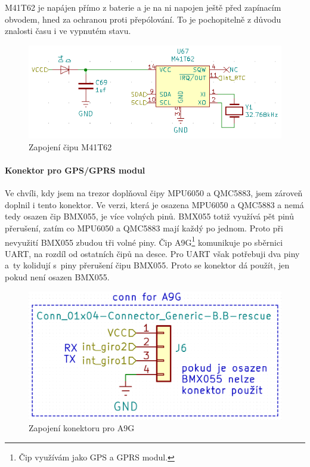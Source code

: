 M41T62 je napájen přímo z baterie a je na ni napojen ještě před zapínacím obvodem, hned za ochranou proti přepólování.
To je pochopitelně z důvodu znalosti času i ve vypnutém stavu.

\begin{figure}[htbp]
    \centering
    \includegraphics[width=\textwidth]{kapitoly/obrazky/E4/vnimani/RTC.png}
    \caption{Zapojení čipu M41T62}
    \label{fig:E4-M41T62}
\end{figure}

\paragraph{Konektor pro GPS/GPRS modul}
Ve chvíli, kdy jsem na trezor do\-pl\-ňo\-val čipy MPU6050 a QMC5883, jsem zároveň doplnil i tento konektor. Ve verzi, která je osazena MPU6050 a QMC5883 a nemá tedy osazen čip BMX055, 
je více volných pinů. BMX055 totiž využívá pět pinů přerušení, zatím co MPU6050 a QMC5883 mají každý po jednom. Proto při nevyužití BMX055 zbudou tři volné piny.
Čip A9G\footnote{Čip využívám jako GPS a GPRS modul.} komunikuje po sběrnici UART, na rozdíl od ostatních čipů na desce. Pro UART však potřebuji
dva piny a~ty kolidují s~piny přerušení čipu BMX055. Proto se konektor dá použít, jen pokud není osazen BMX055.

\begin{figure}[htbp]
    \centering
    \includegraphics[width=\textwidth]{kapitoly/obrazky/E4/vnimani/conn-A9G.png}
    \caption{Zapojení konektoru pro A9G}
    \label{fig:E4-A9G}
\end{figure}
